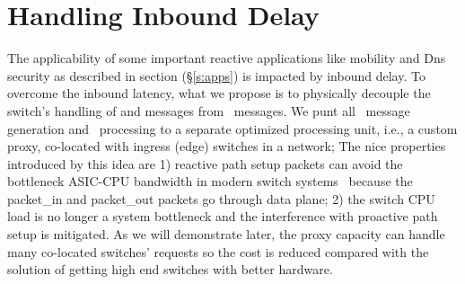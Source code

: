 \section{Handling Inbound Delay}
\label{s:inbound}

\iffalse
\aditya{this section talks about packetout, but our measurements don't
  cover them}

Recall the 3 steps I1--I3 taken by a switch to process \packetin described in
Section XXX. Step I1 is typically quite fast. The latencies we observe is mainly
due to steps I2 and I3. Earlier measurements~\cite{flowvisor} show that these
steps are slow due to unoptimized switch implementations. Our measurements
indicate that the newer switches we measured have better implementations of
these steps, but latency arises nevertheless due to contention between
simultaneous processing of \packetin\ messages alongside \flowmod\ and
\pollstats\ commands received from the controller. \aditya{this can go at the
  end of section 3} 
\fi
\iffalse
Reactive flow path setup enables fine-grained visibility and more programmability of the network. 
As we have mentioned, mobility support is one appealing reactive application enabled by SDN. 
When mobile users move across the networks, the SDN controller can setup paths in an on-demand manner. 
Another promising reactive application is security. Network administrator can program the network devices and 
let the packets matching certain fields go to the SDN controller. For example, all DNS traffic can be redirect to 
the SDN controller and the controller checks whether the flows are trying to access some malicious websites on a blacklist.
\fi

\iffalse
{}
The applicability of some important reactive applications like mobility and Dns security as described in section (\S\ref{s:apps}) is impacted by inbound delay.
To overcome the inbound latency, what we propose is to
  physically decouple the switch's handling of \packetin and \packetout messages from \flowmod\ messages. 
We punt all \packetin\ message generation and \packetout\ processing to a
separate optimized processing unit, i.e., a custom proxy, co-located with ingress (edge)
switches in a network; The nice properties introduced by this idea are 
1) reactive path setup packets can avoid the bottleneck ASIC-CPU bandwidth in modern switch systems~\cite{devoflow} because the packet\_in 
and packet\_out packets go through data plane; 2) the switch CPU load is no longer a system bottleneck and 
the interference with proactive path setup is mitigated. As we will demonstrate later, 
the proxy capacity can handle many co-located switches' requests so the cost is reduced 
compared with the solution of getting high end switches with better hardware.


